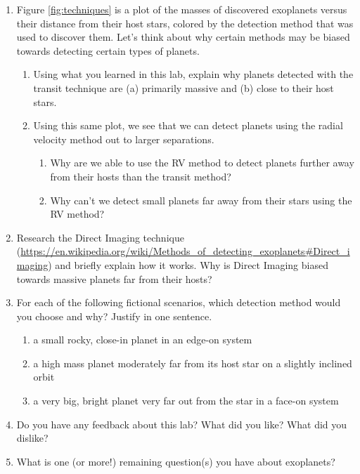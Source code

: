 \documentclass[11pt]{article}
\begin{document}
\begin{enumerate}
    \item Figure \ref{fig:techniques} is a plot of the masses of discovered exoplanets versus their distance from their host stars, colored by the detection method that was used to discover them. Let's think about why certain methods may be biased towards detecting certain types of planets.
    \begin{enumerate}
        \item Using what you learned in this lab, explain why planets detected with the transit technique are (a) primarily massive and (b) close to their host stars. %
        \item Using this same plot, we see that we can detect planets using the radial velocity method out to larger separations.
        \begin{enumerate}
            \item Why are we able to use the RV method to detect planets further away from their hosts than the transit method? %
            \item Why can't we detect small planets far away from their stars using the RV method? %
        \end{enumerate}
    \end{enumerate}
    \item Research the Direct Imaging technique (\url{https://en.wikipedia.org/wiki/Methods_of_detecting_exoplanets#Direct_imaging}) and briefly explain how it works.  Why is Direct Imaging biased towards massive planets far from their hosts?
    \item For each of the following fictional scenarios, which detection method would you choose and why? Justify in one sentence.
    \begin{enumerate}
        \item a small rocky, close-in planet in an edge-on system %
        \item a high mass planet moderately far from its host star on a slightly inclined orbit %
        \item a very big, bright planet very far out from the star in a face-on system %
    \end{enumerate}
    \item Do you have any feedback about this lab?  What did you like? What did you dislike?
    \item What is one (or more!) remaining question(s) you have about exoplanets?
\end{enumerate}
\end{document}
